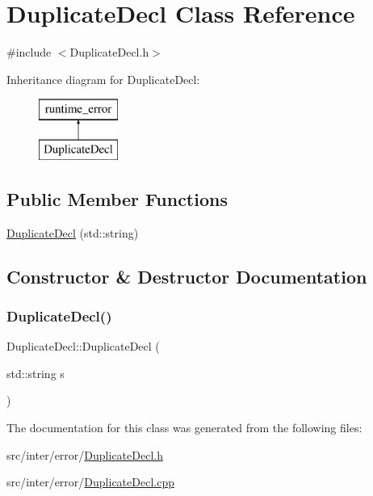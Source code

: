 \hypertarget{class_duplicate_decl}{}\section{Duplicate\+Decl Class Reference}
\label{class_duplicate_decl}


{\ttfamily \#include $<$Duplicate\+Decl.\+h$>$}

Inheritance diagram for Duplicate\+Decl\+:\begin{figure}[H]
\begin{center}
\leavevmode
\includegraphics[height=2.000000cm]{class_duplicate_decl}
\end{center}
\end{figure}
\subsection*{Public Member Functions}
\begin{DoxyCompactItemize}
\item 
\hyperlink{class_duplicate_decl_a101a07d46a713363621da69f46a711b3}{Duplicate\+Decl} (std\+::string)
\end{DoxyCompactItemize}


\subsection{Constructor \& Destructor Documentation}
\mbox{\label{class_duplicate_decl_a101a07d46a713363621da69f46a711b3}} 
\subsubsection{\texorpdfstring{Duplicate\+Decl()}{DuplicateDecl()}}
{\footnotesize\ttfamily Duplicate\+Decl\+::\+Duplicate\+Decl (\begin{DoxyParamCaption}\item[{std\+::string}]{s }\end{DoxyParamCaption})\hspace{0.3cm}{\ttfamily [explicit]}}



The documentation for this class was generated from the following files\+:\begin{DoxyCompactItemize}
\item 
src/inter/error/\hyperlink{_duplicate_decl_8h}{Duplicate\+Decl.\+h}\item 
src/inter/error/\hyperlink{_duplicate_decl_8cpp}{Duplicate\+Decl.\+cpp}\end{DoxyCompactItemize}
